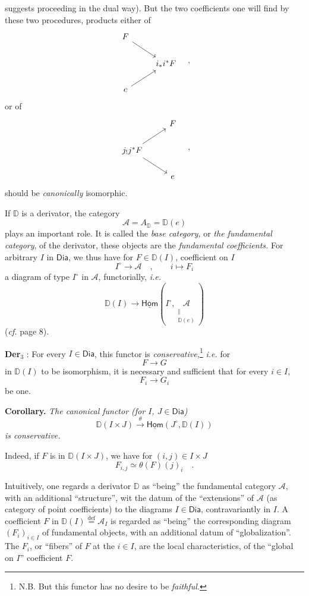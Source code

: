 \documentclass[11pt]{article}
\newcommand{\printedpage}[1]{\marginpar{\footnotesize p.~#1}}
\newcommand{\msp}[1]{\marginpar{\footnotesize [#1]}}
\newcommand{\DD}{\mathbb{D}}
\newcommand{\uHom}{\underline{\mathsf{Hom}}}
\newcommand{\Dia}{\mathsf{Dia}}
\newcommand{\defeq}{\overset{\text{def}}{=}}
\begin{document}
\printedpage{9}
\noindent suggests proceeding in the dual way). But the two coefficients one will find by these two procedures, products either of
\[
\begin{tikzcd}
F \arrow[dr] & \\
 & i_*i^*F \\
e \arrow[ur] &
\end{tikzcd}
\quad ,
\]
or of
\[
\begin{tikzcd}
 & F \\
j_!j^*F \arrow[ur] \arrow[dr] & \\
 & e
\end{tikzcd}
\quad ,
\]
should be \textit{canonically} isomorphic.

\noindent\msp{page 11}If $\DD$ is a derivator, the category
\[
\mathcal{A} = A_{\DD} = \DD(e) %
\]
plays an important role. It is called the \textit{base category,} or \textit{the fundamental category}, of the derivator, these objects are the \textit{fundamental coefficients.} For arbitrary $I$ in $\Dia$, we thus have for $F \in \DD(I)$, coefficient on $I$ %
\[
I^\circ \longrightarrow \mathcal{A} \quad , \qquad i \longmapsto F_i
\]
a diagram of type $I^\circ$ in $\mathcal{A}$, functorially, \textit{i.e.}
\[
\DD(I)\longrightarrow
\uHom(I^\circ,\underset{\substack{\Vert\\\DD(e)}}{\mathcal A})
\]
(\textit{cf.} page 8).

\noindent\textbf{Der}$_3$ : For every $I \in \Dia$, this functor is \textit{conservative,}\footnote[4]{N.B. But this functor has no desire to be \textit{faithful.}} \textit{i.e.} for
\[
F \longrightarrow G
\]
\printedpage{10}%
in $\DD(I)$ to be isomorphism, it is necessary and sufficient that for every $i \in I$,
\[
F_i \longrightarrow G_i
\]
be one.

\noindent\textbf{Corollary.} \textit{The canonical functor (for $I$, $J \in \Dia$)}
\[
\DD(I \times J) \xrightarrow{\ \theta\ } \uHom(J^\circ, \DD(I))
\]
\textit{is conservative.}

Indeed, if $F$ is in $\DD(I \times J)$, we have for $(i,j) \in I \times J$
\[
F_{i,j} \simeq \theta(F)(j)_i \quad .
\]

\noindent\msp{page 12}Intuitively, one regards a derivator $\DD$ as ``being'' the fundamental category $\mathcal{A}$, with an additional ``structure'', wit the datum of the ``extensions'' of $\mathcal{A}$ (as category of point coefficients) to the diagrams $I \in \Dia$, contravariantly in $I$. A coefficient $F$ in $\DD(I) \defeq \mathcal{A}_I$ is regarded as ``being'' the corresponding diagram $(F_i)_{i\in I}$ of fundamental objects, with an additional datum of ``globalization''. The $F_i$, or ``fibers'' of $F$ at the $i \in I$, are the local characteristics, of the ``global on $I$'' coefficient $F$. %
\end{document}
